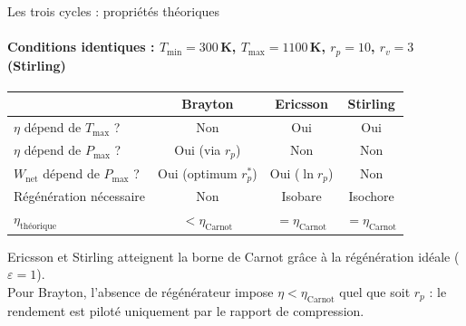 \documentclass[aspectratio=43, 10pt]{beamer}
\newcommand{\Tmin}{T_{\min}}
\newcommand{\Tmax}{T_{\max}}
\newcommand{\etaC}{\eta_{\text{Carnot}}}
\newcommand{\Wnet}{W_{\text{net}}}
\begin{document}
\begin{frame}{Les trois cycles : propri\'et\'es th\'eoriques}
  \framesubtitle{Conditions identiques :
    $\Tmin=300$\,K, $\Tmax=1100$\,K, $r_p=10$, $r_v=3$ (Stirling)}

  \begin{center}\small
  \renewcommand{\arraystretch}{1.2}
  \begin{tabular}{lccc}
    \toprule
    & \textbf{Brayton} & \textbf{Ericsson} & \textbf{Stirling} \\
    \midrule
    $\eta$ d\'epend de $\Tmax$ ?
      & \textcolor{rougeCycle}{Non} & \textcolor{vertCycle}{Oui} & \textcolor{vertCycle}{Oui} \\
    $\eta$ d\'epend de $P_{\max}$ ?
      & Oui (via $r_p$) & \textcolor{vertCycle}{Non} & Non \\
    $\Wnet$ d\'epend de $P_{\max}$ ?
      & Oui (optimum $r_p^*$) & Oui ($\ln r_p$) & Non \\
    R\'eg\'en\'eration n\'ecessaire
      & Non & Isobare & Isochore \\
    $\eta_{\text{th\'eorique}}$
      & $< \etaC$ & $= \etaC$ & $= \etaC$ \\
    \bottomrule
  \end{tabular}
  \end{center}

  \vspace{0.3em}
  \begin{exampleblock}{}
    \small
    Ericsson et Stirling atteignent la borne de Carnot
    gr\^ace \`a la r\'eg\'en\'eration id\'eale ($\varepsilon = 1$).\\[3pt]
    Pour Brayton, l'absence de r\'eg\'en\'erateur impose
    $\eta < \etaC$ quel que soit $r_p$ : le rendement est
    pilot\'e uniquement par le rapport de compression.
  \end{exampleblock}

\end{frame}
\end{document}
